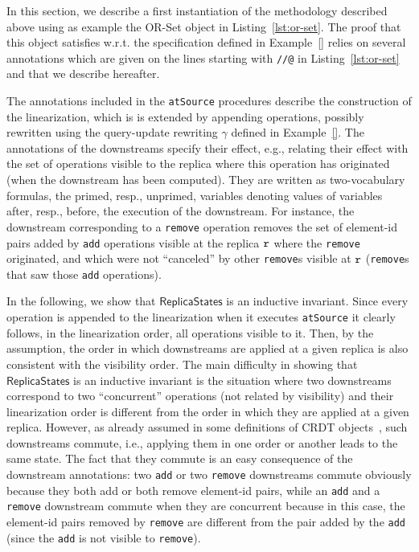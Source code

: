 In this section, we describe a first instantiation of the methodology described above using as example the OR-Set object in Listing~\ref{lst:or-set}. The proof that this object satisfies \crdtlin{} w.r.t. the specification defined in Example~\ref{} relies on several annotations which are given on the lines starting with {\tt //@} in Listing~\ref{lst:or-set} and that we describe hereafter.


The annotations included in the \lstinline|atSource| procedures describe the construction of the linearization,
which is is extended by appending operations, possibly rewritten using the query-update rewriting $\gamma$ defined in Example~\ref{}. %
The annotations of the downstreams specify their effect, e.g., relating their effect with the set of operations visible to the replica where this operation has originated (when the downstream has been computed). They are written as two-vocabulary formulas, the primed, resp., unprimed, variables denoting values of variables after, resp., before, the execution of the downstream.
For instance, the downstream corresponding to a {\tt remove} operation removes the set of element-id pairs added by {\tt add} operations visible at the replica $\mathtt{r}$ where the {\tt remove} originated, and which were not ``canceled'' by other {\tt remove}s visible at $\mathtt{r}$ ({\tt remove}s that saw those {\tt add} operations).

In the following, we show that $\mathsf{ReplicaStates}$ is an inductive invariant. Since every operation is appended to the linearization when it executes \lstinline|atSource| it clearly follows, in the linearization order, all operations visible to it. Then, by the {} assumption, the order in which downstreams are applied at a given replica is also consistent with the visibility order. The main difficulty in showing that $\mathsf{ReplicaStates}$ is an inductive invariant is the situation where two downstreams correspond to two ``concurrent'' operations (not related by visibility) and their linearization order is different from the order in which they are applied at a given replica. However, as already assumed in some definitions of CRDT objects~\cite{}, such downstreams commute, i.e., applying them in one order or another leads to the same state. The fact that they commute is an easy consequence of the downstream annotations: two {\tt add} or two {\tt remove} downstreams commute obviously because they both add or both remove element-id pairs, while an {\tt add} and a {\tt remove} downstream commute when they are concurrent because in this case, the element-id pairs removed by {\tt remove} are different from the pair added by the {\tt add} (since the {\tt add} is not visible to {\tt remove}).

